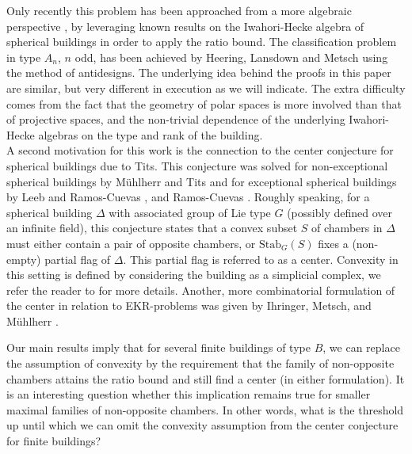 \documentclass[11pt]{article}
\begin{document}
Only recently this problem has been approached from a more algebraic perspective  \cite{AlgebraicApproach,AlgebraicApproach2}, by leveraging known results on the Iwahori-Hecke algebra of spherical buildings in order to apply the ratio bound. The classification problem in type $A_n$, $n$ odd, has been achieved by Heering, Lansdown and Metsch \cite{klaus_jesse_philipp} using the method of antidesigns. The underlying idea behind the proofs in this paper are similar, but very different in execution as we will indicate. The extra difficulty comes from the fact that the geometry of polar spaces is more involved than that of projective spaces, and the non-trivial dependence of the underlying Iwahori-Hecke algebras on the type and rank of the building. \\

A second motivation for this work is the connection to the center conjecture for spherical buildings due to Tits. This conjecture was solved for non-exceptional spherical buildings by M\"uhlherr and Tits \cite{MuhlherrTits06} and for exceptional spherical buildings by Leeb and Ramos-Cuevas \cite{LR11}, and Ramos-Cuevas \cite{RamosCuevas13}.
Roughly speaking, for a spherical building $\Delta$ with associated group of Lie type $G$ (possibly defined over an infinite field), this conjecture states that a convex subset $S$ of chambers in $\Delta$ must either contain a pair of opposite chambers, or $\mathrm{Stab}_G(S)$ fixes a (non-empty) partial flag of $\Delta$. This partial flag is referred to as a center.
Convexity in this setting is defined by considering the building as a simplicial complex, we refer the reader to \cite[1.3]{Titsbook} for more details. Another, more combinatorial formulation of the center in relation to EKR-problems was given by Ihringer, Metsch, and M\"uhlherr \cite{IMM18}. 

Our main results imply that for several finite buildings of type $B$, we can replace the assumption of convexity by the requirement that the family of non-opposite chambers attains the ratio bound and still find a center (in either formulation). It is an interesting question whether this implication remains true for smaller maximal families of non-opposite chambers. In other words, what is the threshold up until which we can omit the convexity assumption from the center conjecture for finite buildings? \\ 
\end{document}
